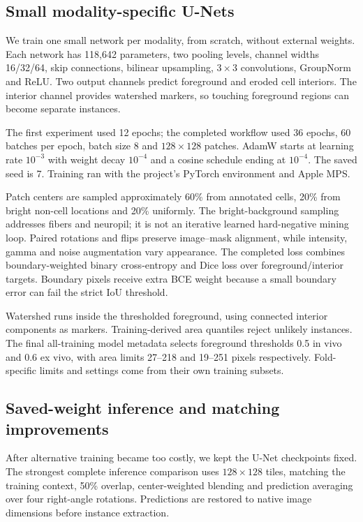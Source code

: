 \documentclass[11pt]{article}
\begin{document}
\subsection{Small modality-specific U-Nets}
We train one small network per modality, from scratch, without external weights. Each network has 118,642 parameters, two pooling levels, channel widths 16/32/64, skip connections, bilinear upsampling, $3\times3$ convolutions, GroupNorm and ReLU. Two output channels predict foreground and eroded cell interiors. The interior channel provides watershed markers, so touching foreground regions can become separate instances.

The first experiment used 12 epochs; the completed workflow used 36 epochs, 60 batches per epoch, batch size 8 and $128\times128$ patches. AdamW starts at learning rate $10^{-3}$ with weight decay $10^{-4}$ and a cosine schedule ending at $10^{-4}$. The saved seed is 7. Training ran with the project's PyTorch environment and Apple MPS.

Patch centers are sampled approximately 60\% from annotated cells, 20\% from bright non-cell locations and 20\% uniformly. The bright-background sampling addresses fibers and neuropil; it is not an iterative learned hard-negative mining loop. Paired rotations and flips preserve image--mask alignment, while intensity, gamma and noise augmentation vary appearance. The completed loss combines boundary-weighted binary cross-entropy and Dice loss over foreground/interior targets. Boundary pixels receive extra BCE weight because a small boundary error can fail the strict IoU threshold.

Watershed runs inside the thresholded foreground, using connected interior components as markers. Training-derived area quantiles reject unlikely instances. The final all-training model metadata selects foreground thresholds 0.5 in vivo and 0.6 ex vivo, with area limits 27--218 and 19--251 pixels respectively. Fold-specific limits and settings come from their own training subsets.

\subsection{Saved-weight inference and matching improvements}
After alternative training became too costly, we kept the U-Net checkpoints fixed. The strongest complete inference comparison uses $128\times128$ tiles, matching the training context, 50\% overlap, center-weighted blending and prediction averaging over four right-angle rotations. Predictions are restored to native image dimensions before instance extraction.
\end{document}
